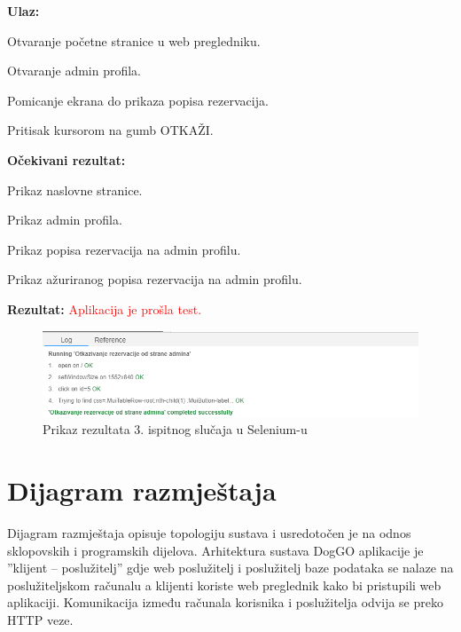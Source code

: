 			\noindent \textbf{Ulaz:}
			\begin{packed_enum}
				
				\item Otvaranje početne stranice u web pregledniku.
				\item Otvaranje admin profila.
				\item Pomicanje ekrana do prikaza popisa rezervacija.
				\item Pritisak kursorom na gumb OTKAŽI.
				
			\end{packed_enum}
			\textbf{Očekivani rezultat:}
			\begin{packed_enum}
				
				\item Prikaz naslovne stranice.
				\item Prikaz admin profila.
				\item Prikaz popisa rezervacija na admin profilu.
				\item Prikaz ažuriranog popisa rezervacija na admin profilu.
				
			\end{packed_enum}
			\textbf{Rezultat:} \textcolor{red}{Aplikacija je prošla test.}
			
			\begin{figure}[H]
				\includegraphics[scale=0.7]{slike/otkazivanjeRezervacijeOdStraneAdmina.PNG} 
				\centering
				\caption{Prikaz rezultata 3. ispitnog slučaja u Selenium-u}
				\label{fig:sustav-treci-slucaj}
			\end{figure}
			\eject 
		
		
		\section{Dijagram razmještaja}
			
			 Dijagram razmještaja opisuje topologiju sustava i usredotočen je na odnos sklopovskih i programskih dijelova. 
			 Arhitektura sustava DogGO aplikacije je ”klijent – poslužitelj” gdje web poslužitelj i poslužitelj baze podataka se nalaze na poslužiteljskom računalu a klijenti koriste web preglednik kako bi pristupili web aplikaciji. Komunikacija između računala korisnika i poslužitelja odvija se preko HTTP veze.
			 
